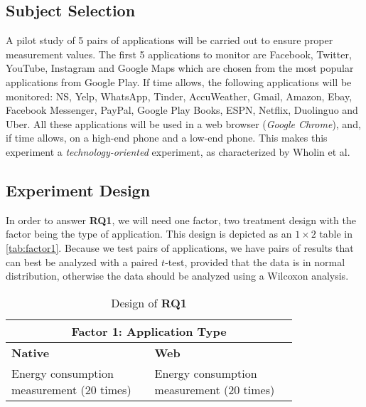 \subsection{Subject Selection}
A pilot study of 5 pairs of applications will be carried out to ensure proper measurement values. The first 5 applications to monitor are Facebook, Twitter, YouTube, Instagram and Google Maps which are chosen from the most popular applications from Google Play. If time allows, the following applications will be monitored: NS, Yelp, WhatsApp, Tinder, AccuWeather, Gmail, Amazon, Ebay, Facebook Messenger, PayPal, Google Play Books, ESPN, Netflix, Duolinguo and Uber. All these applications will be used in  a web browser (\textit{Google Chrome}), and, if time allows, on a high-end phone and a low-end phone. This makes this experiment a \textit{technology-oriented} experiment, as characterized by Wholin et al. \cite{wohlin12}
\subsection{Experiment Design}\label{sec:planning-design}
In order to answer \textbf{RQ1}, we will need one factor, two treatment design with the factor being the type of application. This design is depicted as an $1\times2$ table in \autoref{tab:factor1}. Because we test pairs of applications, we have pairs of results that can best be analyzed with a paired $t$-test, provided that the data is in normal distribution, otherwise the data should be analyzed using a Wilcoxon analysis.

\begin{table}[ht!]
    \centering
    \begin{tabular}{|p{0.4\linewidth}|p{0.4\linewidth}|}
        \hline
        \multicolumn{2}{|c|}{Factor 1: Application Type}\\
        \hline
        \textbf{Native} &  \textbf{Web}\\
        \hline
        Energy consumption measurement (20 times) & Energy consumption measurement (20 times)\\
        \hline
        
    \end{tabular}
    \caption{Design of \textbf{RQ1}}
    \label{tab:factor1}
\end{table}

